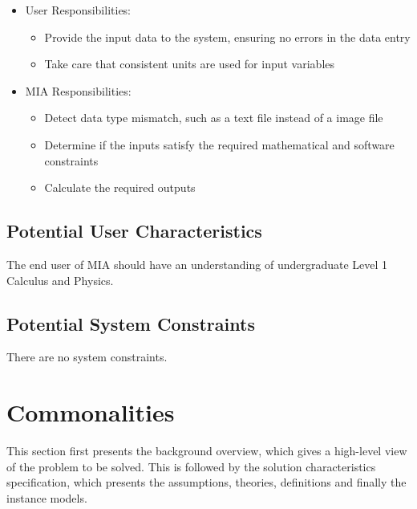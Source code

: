 \documentclass[12pt]{article}
\newcommand{\famname}{MIA} %
\begin{document}
\begin{itemize}
\item User Responsibilities:
\begin{itemize}
\item Provide the input data to the system, ensuring no errors in the data entry
\item Take care that consistent units are used for input variables
\end{itemize}
\item \famname{} Responsibilities:
\begin{itemize}
\item Detect data type mismatch, such as a text file instead of a image file
\item Determine if the inputs satisfy the required mathematical and software constraints
\item Calculate the required outputs
\end{itemize}
\end{itemize}

\begin{center}
\label{fg_syscontext}
\end{center}

\subsection{Potential User Characteristics} \label{sec_UserCharacteristics}

The end user of \famname{} should have an understanding of undergraduate Level
1 Calculus and Physics.

\subsection{Potential System Constraints}

There are no system constraints.

\section{Commonalities}
This section first presents the background overview, which gives a high-level view of the
problem to be solved. This is followed by the solution characteristics specification, which
presents the assumptions, theories, definitions and finally the instance models.
\end{document}
